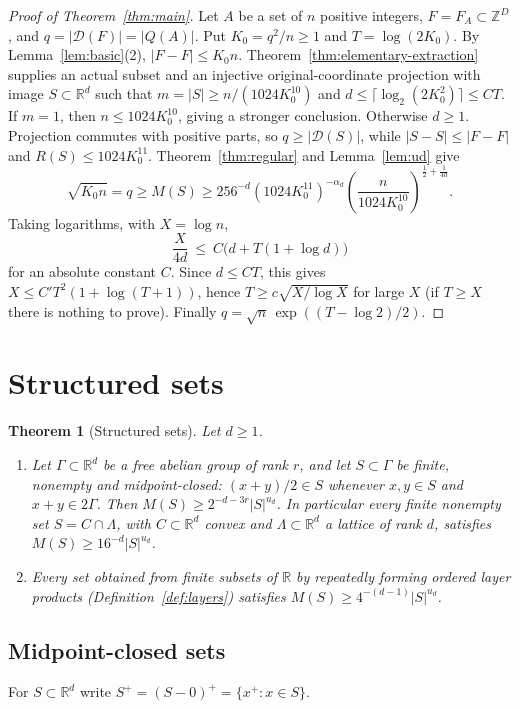 \documentclass[11pt]{amsart}
\newtheorem{theorem}{Theorem}[section]
\theoremstyle{definition}
\theoremstyle{remark}
\newcommand{\R}{\mathbb{R}}
\newcommand{\Z}{\mathbb{Z}}
\newcommand{\Dp}{\mathcal{D}}
\newcommand{\Mf}{M}
\begin{document}
\begin{proof}[Proof of Theorem~\ref{thm:main}]
Let $A$ be a set of $n$ positive integers, $F=F_A\subset\Z^D$, and $q=|\Dp(F)|=|Q(A)|$. Put $K_0=q^2/n\ge1$ and $T=\log(2K_0)$. By Lemma~\ref{lem:basic}(2), $|F-F|\le K_0n$. Theorem~\ref{thm:elementary-extraction} supplies an actual subset and an injective original-coordinate projection with image $S\subset\R^d$ such that $m=|S|\ge n/(1024K_0^{10})$ and $d\le\lceil\log_2(2K_0^2)\rceil\le CT$. If $m=1$, then $n\le1024K_0^{10}$, giving a stronger conclusion. Otherwise $d\ge1$. Projection commutes with positive parts, so $q\ge|\Dp(S)|$, while $|S-S|\le|F-F|$ and $R(S)\le1024K_0^{11}$. Theorem~\ref{thm:regular} and Lemma~\ref{lem:ud} give
\[
\sqrt{K_0n}=q\ge\Mf(S)\ge256^{-d}(1024K_0^{11})^{-\alpha_d}
\left(\frac{n}{1024K_0^{10}}\right)^{\frac12+\frac1{4d}}.
\]
Taking logarithms, with $X=\log n$,
\[
\frac{X}{4d}\ \le\ C\big(d+T(1+\log d)\big)
\]
for an absolute constant $C$. Since $d\le CT$, this gives $X\le C'T^2(1+\log(T+1))$, hence $T\ge c\sqrt{X/\log X}$ for large $X$ (if $T\ge X$ there is nothing to prove). Finally $q=\sqrt n\,\exp((T-\log2)/2)$.
\end{proof}

\section{Structured sets}\label{sec:structured}

\begin{theorem}[Structured sets]\label{thm:structured}
Let $d\ge1$.
\begin{enumerate}
\item Let $\Gamma\subset\R^d$ be a free abelian group of rank $r$, and let $S\subset\Gamma$ be finite, nonempty and midpoint-closed: $(x+y)/2\in S$ whenever $x,y\in S$ and $x+y\in2\Gamma$. Then $\Mf(S)\ge 2^{-d-3r}|S|^{u_d}$. In particular every finite nonempty set $S=C\cap\Lambda$, with $C\subset\R^d$ convex and $\Lambda\subset\R^d$ a lattice of rank $d$, satisfies $\Mf(S)\ge16^{-d}|S|^{u_d}$.
\item Every set obtained from finite subsets of $\R$ by repeatedly forming ordered layer products (Definition~\ref{def:layers}) satisfies $\Mf(S)\ge 4^{-(d-1)}|S|^{u_d}$.
\end{enumerate}
\end{theorem}

\subsection*{Midpoint-closed sets}
For $S\subset\R^d$ write $S^+=(S-0)^+=\{x^+:x\in S\}$.
\end{document}
